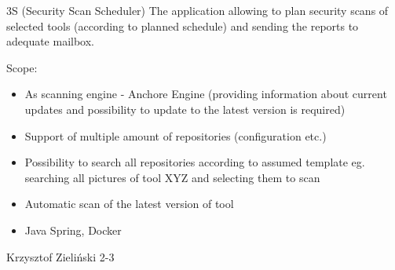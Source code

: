 \begin{project}
{3S (Security Scan Scheduler)}
{The application allowing to plan security scans of selected tools (according to planned schedule) and sending the reports to adequate mailbox.}
{
Scope:
\begin{itemize}
	\item As scanning engine - Anchore Engine (providing information about current updates and possibility to update to the latest version is required)
	\item Support of multiple amount of repositories (configuration etc.)
	\item Possibility to search all repositories according to assumed template eg. searching all pictures of tool XYZ and selecting them to scan
	\item Automatic scan of the latest version of tool
\end{itemize}
}
{
\begin{itemize}
	\item Java Spring, Docker
\end{itemize}
}
{Krzysztof Zieliński}
{2-3}
\end{project}
